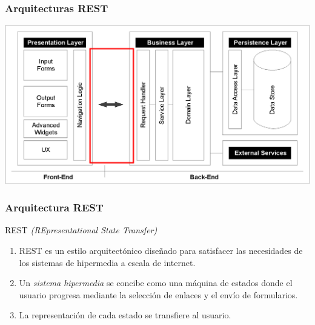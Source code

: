 \documentclass[handout,a4paper,slidestop,xcolor=pst,blue]{beamer}
\begin{document}
\begin{frame}
    \frametitle{Arquitecturas REST}
    \begin{center}
        \includegraphics[width=\linewidth]{images/rest/enterpriseArchitectures(rest).eps}
    \end{center}
\end{frame}

\begin{frame}[c]
	\frametitle{Arquitectura REST}
    \begin{block}{REST \emph{(REpresentational State Transfer)}}
        \begin{enumerate}[<+->]
            \item  REST es un estilo arquitectónico diseñado para satisfacer las necesidades de los sistemas de hipermedia a escala de internet.
            \item Un \emph{sistema hipermedia} se concibe como una máquina de estados donde el usuario progresa mediante la selección de enlaces y el envío de formularios.
            \item La representación de cada estado se transfiere al usuario.
        \end{enumerate}
    \end{block}
\end{frame}
\end{document}
